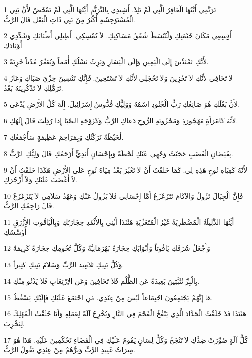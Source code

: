 \par 1 تَرَنَّمِي أَيَّتُهَا الْعَاقِرُ الَّتِي لَمْ تَلِدْ. أَشِيدِي بِالتَّرَنُّمِ أَيَّتُهَا الَّتِي لَمْ تَمْخَضْ لأَنَّ بَنِي الْمُسْتَوْحِشَةِ أَكْثَرُ مِنْ بَنِي ذَاتِ الْبَعْلِ قَالَ الرَّبُّ.
\par 2 أَوْسِعِي مَكَانَ خَيْمَتِكِ وَلْتُبْسَطْ شُقَقُ مَسَاكِنِكِ. لاَ تُمْسِكِي. أَطِيلِي أَطْنَابَكِ وَشَدِّدِي أَوْتَادَكِ
\par 3 لأَنَّكِ تَمْتَدِّينَ إِلَى الْيَمِينِ وَإِلَى الْيَسَارِ وَيَرِثُ نَسْلُكِ أُمَماً وَيُعَمِّرُ مُدُناً خَرِبَةً.
\par 4 لاَ تَخَافِي لأَنَّكِ لاَ تَخْزِينَ وَلاَ تَخْجَلِي لأَنَّكِ لاَ تَسْتَحِينَ. فَإِنَّكِ تَنْسِينَ خِزْيَ صَبَاكِ وَعَارُ تَرَمُّلِكِ لاَ تَذْكُرِينَهُ بَعْدُ.
\par 5 لأَنَّ بَعْلَكِ هُوَ صَانِعُكِ رَبُّ الْجُنُودِ اسْمُهُ وَوَلِيُّكِ قُدُّوسُ إِسْرَائِيلَ. إِلَهَ كُلِّ الأَرْضِ يُدْعَى.
\par 6 لأَنَّهُ كَامْرَأَةٍ مَهْجُورَةٍ وَمَحْزُونَةِ الرُّوحِ دَعَاكِ الرَّبُّ وَكَزَوْجَةِ الصِّبَا إِذَا رُذِلَتْ قَالَ إِلَهُكِ.
\par 7 لُحَيْظَةً تَرَكْتُكِ وَبِمَرَاحِمَ عَظِيمَةٍ سَأَجْمَعُكِ.
\par 8 بِفَيَضَانِ الْغَضَبِ حَجَبْتُ وَجْهِي عَنْكِ لَحْظَةً وَبِإِحْسَانٍ أَبَدِيٍّ أَرْحَمُكِ قَالَ وَلِيُّكِ الرَّبُّ.
\par 9 لأَنَّهُ كَمِيَاهِ نُوحٍ هَذِهِ لِي. كَمَا حَلَفْتُ أَنْ لاَ تَعْبُرَ بَعْدُ مِيَاهُ نُوحٍ عَلَى الأَرْضِ هَكَذَا حَلَفْتُ أَنْ لاَ أَغْضَبَ عَلَيْكِ وَلاَ أَزْجُرَكِ.
\par 10 فَإِنَّ الْجِبَالَ تَزُولُ وَالآكَامَ تَتَزَعْزَعُ أَمَّا إِحْسَانِي فَلاَ يَزُولُ عَنْكِ وَعَهْدُ سَلاَمِي لاَ يَتَزَعْزَعُ قَالَ رَاحِمُكِ الرَّبُّ.
\par 11 أَيَّتُهَا الذَّلِيلَةُ الْمُضْطَرِبَةُ غَيْرُ الْمُتَعَزِّيَةِ هَئَنَذَا أَبْنِي بِالأُثْمُدِ حِجَارَتَكِ وَبِالْيَاقُوتِ الأَزْرَقِ أُؤَسِّسُكِ
\par 12 وَأَجْعَلُ شُرَفَكِ يَاقُوتاً وَأَبْوَابَكِ حِجَارَةً بَهْرَمَانِيَّةً وَكُلَّ تُخُومِكِ حِجَارَةً كَرِيمَةً
\par 13 وَكُلَّ بَنِيكِ تَلاَمِيذَ الرَّبِّ وَسَلاَمَ بَنِيكِ كَثِيراً.
\par 14 بِالْبِرِّ تُثَبَّتِينَ بَعِيدَةً عَنِ الظُّلْمِ فَلاَ تَخَافِينَ وَعَنِ الاِرْتِعَابِ فَلاَ يَدْنُو مِنْكِ.
\par 15 هَا إِنَّهُمْ يَجْتَمِعُونَ اجْتِمَاعاً لَيْسَ مِنْ عِنْدِي. مَنِ اجْتَمَعَ عَلَيْكِ فَإِلَيْكِ يَسْقُطُ.
\par 16 هَئَنَذَا قَدْ خَلَقْتُ الْحَدَّادَ الَّذِي يَنْفُخُ الْفَحْمَ فِي النَّارِ وَيُخْرِجُ آلَةً لِعَمَلِهِ وَأَنَا خَلَقْتُ الْمُهْلِكَ لِيَخْرِبَ.
\par 17 كُلُّ آلَةٍ صُوِّرَتْ ضِدَّكِ لاَ تَنْجَحُ وَكُلُّ لِسَانٍ يَقُومُ عَلَيْكِ فِي الْقَضَاءِ تَحْكُمِينَ عَلَيْهِ. هَذَا هُوَ مِيرَاثُ عَبِيدِ الرَّبِّ وَبِرُّهُمْ مِنْ عِنْدِي يَقُولُ الرَّبُّ.

